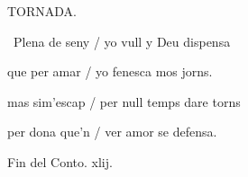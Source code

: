 \documentclass[12pt]{article}
\begin{document}
\begin{estrofaExtra}%




\begin{tornada}

\pagina{[52v]} TORNADA.

\end{tornada}


\end{estrofaExtra}


\begin{estrofa}

 \textparagraph\  Plena de seny / yo vull y Deu dispensa

 que per amar / yo fenesca mos jorns.

 mas sim'escap / per null temps dare torns

 per dona que'n / ver amor se defensa.

\end{estrofa}



\begin{estrofaExtra}%

\begin{final}

Fin del Conto. xlij.

\end{final}

\end{estrofaExtra}
\end{document}
